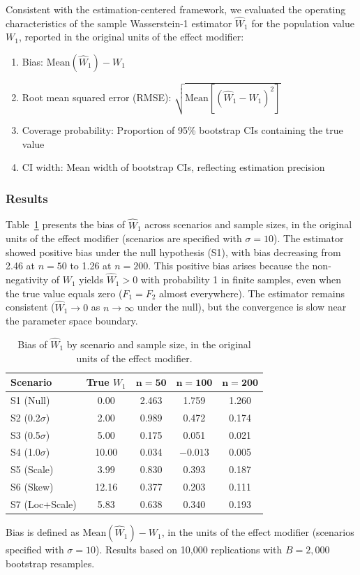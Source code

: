 \documentclass[AMA,Times1COL]{WileyNJDv5}
\begin{document}
Consistent with the estimation-centered framework, we evaluated the operating characteristics of the sample Wasserstein-1 estimator $\widehat{W}_1$ for the population value $W_1$, reported in the original units of the effect modifier:
\begin{enumerate}[1.]
\item Bias: $\text{Mean}(\widehat{W}_1) - W_1$
\item Root mean squared error (RMSE): $\sqrt{\text{Mean}[(\widehat{W}_1 - W_1)^2]}$
\item Coverage probability: Proportion of 95\% bootstrap CIs containing the true value
\item CI width: Mean width of bootstrap CIs, reflecting estimation precision
\end{enumerate}

\subsubsection{Results}\label{sec:sim_results}

Table~\ref{tab:bias} presents the bias of $\widehat{W}_1$ across scenarios and sample sizes, in the original units of the effect modifier (scenarios are specified with $\sigma = 10$). The estimator showed positive bias under the null hypothesis (S1), with bias decreasing from 2.46 at $n=50$ to 1.26 at $n=200$. This positive bias arises because the non-negativity of $W_1$ yields $\widehat{W}_1 > 0$ with probability 1 in finite samples, even when the true value equals zero ($F_1 = F_2$ almost everywhere). The estimator remains consistent ($\widehat{W}_1 \to 0$ as $n \to \infty$ under the null), but the convergence is slow near the parameter space boundary.

\begin{table}[ht]
\centering
\caption{Bias of $\widehat{W}_1$ by scenario and sample size, in the original units of the effect modifier.\label{tab:bias}}
\begin{tabular}{lcccc}
\toprule
\textbf{Scenario} & \textbf{True $W_1$} & $\boldsymbol{n=50}$ & $\boldsymbol{n=100}$ & $\boldsymbol{n=200}$ \\
\midrule
S1 (Null) & 0.00 & 2.463 & 1.759 & 1.260 \\
S2 (0.2$\sigma$) & 2.00 & 0.989 & 0.472 & 0.174 \\
S3 (0.5$\sigma$) & 5.00 & 0.175 & 0.051 & 0.021 \\
S4 (1.0$\sigma$) & 10.00 & 0.034 & $-0.013$ & 0.005 \\
S5 (Scale) & 3.99 & 0.830 & 0.393 & 0.187 \\
S6 (Skew) & 12.16 & 0.377 & 0.203 & 0.111 \\
S7 (Loc+Scale) & 5.83 & 0.638 & 0.340 & 0.193 \\
\bottomrule
\end{tabular}
\begin{tablenotes}
\item Bias is defined as $\text{Mean}(\widehat{W}_1) - W_1$, in the units of the effect modifier (scenarios specified with $\sigma = 10$). Results based on 10{,}000 replications with $B = 2{,}000$ bootstrap resamples.
\end{tablenotes}
\end{table}
\end{document}
